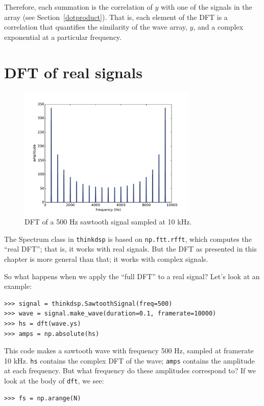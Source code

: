 \documentclass[12pt]{book}
\begin{document}
Therefore, each summation is the correlation of $y$ with one of the
signals in the array (see Section~\ref{dotproduct}).  That is, each
element of the DFT is a correlation that quantifies the similarity of
the wave array, $y$, and a complex exponential at a particular
frequency.


\section{DFT of real signals}

\begin{figure}
\centerline{\includegraphics[height=2.5in]{figs/dft3.pdf}}
\caption{DFT of a 500 Hz sawtooth signal sampled at 10 kHz.}
\label{fig.dft3}
\end{figure}

The Spectrum class in {\tt thinkdsp} is based on {\tt np.ftt.rfft},
which computes the ``real DFT''; that is, it works with real signals.
But the DFT as presented in this chapter is more general than that; it
works with complex signals.

So what happens when we apply the ``full DFT'' to a real signal?
Let's look at an example:

\begin{verbatim}
>>> signal = thinkdsp.SawtoothSignal(freq=500)
>>> wave = signal.make_wave(duration=0.1, framerate=10000)
>>> hs = dft(wave.ys)
>>> amps = np.absolute(hs)
\end{verbatim}

This code makes a sawtooth wave with frequency 500 Hz, sampled at
framerate 10 kHz.  {\tt hs} contains the complex DFT of the wave;
{\tt amps} contains the amplitude at each frequency.  But what
frequency do these amplitudes correspond to?  If we look at the
body of {\tt dft}, we see:

\begin{verbatim}
>>> fs = np.arange(N)
\end{verbatim}
\end{document}
